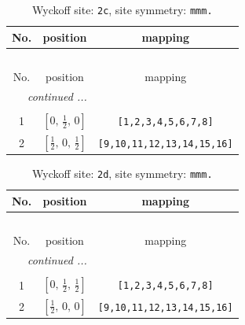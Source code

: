 \documentclass[fleqn,8pt]{jsarticle}
\begin{document}
\renewcommand{\arraystretch}{1.2}
\begin{longtable}{ccc}
\caption{Wyckoff site: {\tt 2c}, site symmetry: {\tt mmm.}}
 \\
 \hline \hline
No. & position & mapping \\ \hline \endfirsthead

\multicolumn{2}{l}{\tablename\ \thetable{}} \\
 \hline \hline
No. & position & mapping \\ \hline \endhead

 \hline \hline
\multicolumn{2}{r}{\footnotesize\it continued ...} \\ \endfoot

 \hline \hline
\multicolumn{2}{r}{} \\ \endlastfoot

1 & $\left[ 0,\, \frac{1}{2},\, 0 \right]$ & {\tt [1,2,3,4,5,6,7,8]} \\ \hline
2 & $\left[ \frac{1}{2},\, 0,\, \frac{1}{2} \right]$ & {\tt [9,10,11,12,13,14,15,16]} \\
\end{longtable}
\renewcommand{\arraystretch}{1.2}
\begin{longtable}{ccc}
\caption{Wyckoff site: {\tt 2d}, site symmetry: {\tt mmm.}}
 \\
 \hline \hline
No. & position & mapping \\ \hline \endfirsthead

\multicolumn{2}{l}{\tablename\ \thetable{}} \\
 \hline \hline
No. & position & mapping \\ \hline \endhead

 \hline \hline
\multicolumn{2}{r}{\footnotesize\it continued ...} \\ \endfoot

 \hline \hline
\multicolumn{2}{r}{} \\ \endlastfoot

1 & $\left[ 0,\, \frac{1}{2},\, \frac{1}{2} \right]$ & {\tt [1,2,3,4,5,6,7,8]} \\ \hline
2 & $\left[ \frac{1}{2},\, 0,\, 0 \right]$ & {\tt [9,10,11,12,13,14,15,16]} \\
\end{longtable}
\renewcommand{\arraystretch}{1.2}
\end{document}
